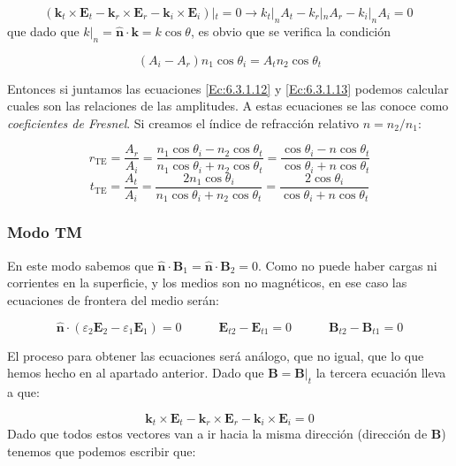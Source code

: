 \documentclass[12pt]{article}
\newcommand{\tquad}{\quad \quad \quad}
\newcommand{\Bn}{\mathbf{B}}
\newcommand{\En}{\mathbf{E}}
\newcommand{\kn}{\mathbf{k}}
\newcommand{\hnn}{\hat{\mathbf{n}}}
\numberwithin{equation}{section}
\numberwithin{figure}{section}
\begin{document}
$$
(\kn_t \times \En_t -  \kn_r \times \En_r - \kn_i \times \En_i ) |_t = 0 \longrightarrow k_t |_n A_t - k_r |_n A_r - k_i |_n A_i = 0 \ 
$$
que dado que $k|_n = \hnn \cdot \kn = k \cos \theta$, es obvio que se verifica la condición 

\begin{equation}
(A_i - A_r) n_1 \cos \theta_i = A_t n_2 \cos \theta_t \label{Ec:6.3.1.13} 
\end{equation}

Entonces si juntamos las ecuaciones \ref{Ec:6.3.1.12} y \ref{Ec:6.3.1.13} podemos calcular cuales son las relaciones de las amplitudes. A estas ecuaciones se las conoce como \textit{coeficientes de Fresnel}. Si creamos el índice de refracción relativo $n=n_2 / n_1$: 

\begin{equation}
r_{\mathrm{TE}} = \dfrac{A_r}{A_i} = \dfrac{n_1 \cos \theta_i - n_2 \cos \theta_t}{n_1 \cos \theta_i + n_2 \cos \theta_t} = \dfrac{\cos \theta_i - n \cos \theta_t}{\cos \theta_i + n \cos \theta_t}
\end{equation}
\begin{equation}
t_{\mathrm{TE}} = \dfrac{A_t}{A_i} = \dfrac{ 2 n_1 \cos \theta_i }{n_1 \cos \theta_i + n_2 \cos \theta_t} = \dfrac{2 \cos \theta_i}{ \cos \theta_i + n \cos \theta_t}
\end{equation}

\subsubsection{Modo TM}

En este modo sabemos que $\hnn  \cdot \Bn_1 = \hnn \cdot \Bn_2 = 0$. Como no puede haber cargas ni corrientes en la superficie, y los medios son no magnéticos, en ese caso las ecuaciones de frontera del medio serán:

\begin{equation}
\hnn \cdot (\varepsilon_2 \En_2 - \varepsilon_1 \En_1) = 0 \tquad \En_{t2}-\En_{t1}=0
\tquad \Bn_{t2}  - \Bn_{t1} = 0 
\end{equation}

El proceso para obtener las ecuaciones será análogo, que no igual, que lo que hemos hecho en al apartado anterior. Dado que $\Bn = \Bn |_t$ la tercera ecuación lleva a que:


$$
\kn_t \times \En_t -  \kn_r \times \En_r - \kn_i \times \En_i  = 0
$$
Dado que todos estos vectores van a ir hacia la misma dirección (dirección de $\Bn$) tenemos que podemos escribir que:
\end{document}
